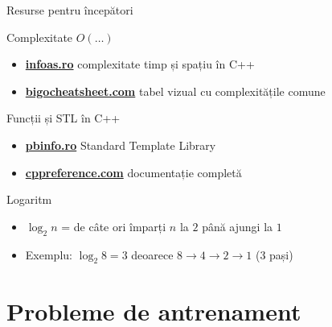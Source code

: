 \documentclass{beamer}
\begin{document}
\begin{frame}{Resurse pentru începători}
  \begin{block}{Complexitate \textemdash{} $O(\ldots)$}
    \begin{itemize}
      \item \href{https://infoas.ro/lectie/91/complexitatea-unui-algoritm-timp-si-spatiu-in-c}{\textbf{infoas.ro}} \textemdash{} complexitate timp și spațiu în C++
      \item \href{https://www.bigocheatsheet.com/}{\textbf{bigocheatsheet.com}} \textemdash{} tabel vizual cu complexitățile comune
    \end{itemize}
  \end{block}
  \begin{block}{Funcții și STL în C++}
    \begin{itemize}
      \item \href{https://www.pbinfo.ro/articole/23702/standard-template-library-stl}{\textbf{pbinfo.ro}} \textemdash{} Standard Template Library
      \item \href{https://cppreference.com}{\textbf{cppreference.com}} \textemdash{} documentație completă
    \end{itemize}
  \end{block}
  \begin{block}{Logaritm}
    \begin{itemize}
      \item $\log_2 n$ = de câte ori împarți $n$ la $2$ până ajungi la $1$
      \item Exemplu: $\log_2 8 = 3$ deoarece $8 \to 4 \to 2 \to 1$ (3 pași)
    \end{itemize}
  \end{block}
\end{frame}

\section{Probleme de antrenament}
\end{document}

